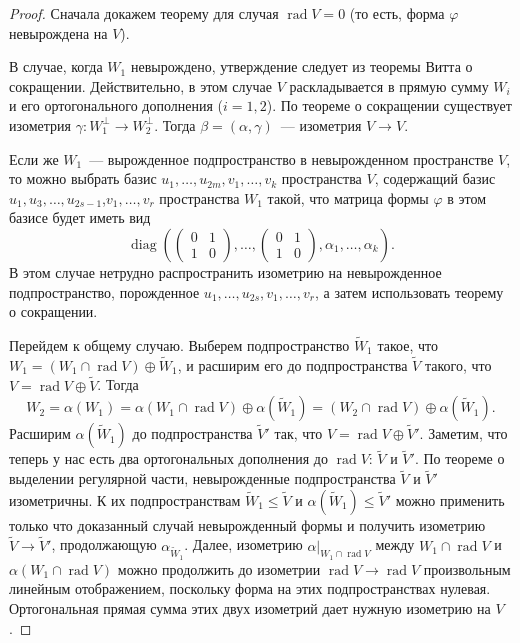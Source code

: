 \documentclass[a4paper,oneside,12pt]{article}
\theoremstyle{plain} { \swapnumbers
\newtheorem{theorem}{Теорема}[subsection]
\newtheorem{corollary}[theorem]{Следствие}
\newtheorem{lemma}[theorem]{Лемма}
\newtheorem{proposition}[theorem]{Утверждение}
\newtheorem{claim}[theorem]{Факт}
}
\theoremstyle{definition} { \swapnumbers
\newtheorem{definition}[theorem]{Определение}
\newtheorem{notation}[theorem]{Обозначение}
\newtheorem{remark}[theorem]{Замечание}
\newtheorem{remarks}[theorem]{Замечания}
\newtheorem{example}[theorem]{Пример}
\newtheorem{examples}[theorem]{Примеры}
\newtheorem{sssection}[theorem]{}
}
\def\tilde{\widetilde}
\def\ph{\varphi}
\def\rad{\operatorname{rad}}
\def\a{\alpha}
\def\b{\beta}
\begin{document}
\begin{proof}
Сначала докажем теорему для случая $\rad V=0$ (то есть, форма $\ph$ невырождена на $V$).

В случае, когда $W_1$ невырождено, утверждение следует из теоремы Витта о сокращении.
Действительно, в этом случае $V$ раскладывается в прямую сумму $W_i$ и его ортогонального
дополнения ($i=1,2$). По теореме о сокращении существует изометрия 
$\gamma:W_1^\perp\to W_2^\perp$. Тогда $\b=(\a,\gamma)$~--- изометрия $V\to V$.

Если же $W_1$~--- вырожденное подпространство в невырожденном пространстве
$V$, то можно выбрать базис $u_1,\dots,u_{2m},v_1,\dots,v_k$ пространства $V$, содержащий базис 
$u_1,u_3,\dots,u_{2s-1}$,\allowbreak $v_1,\dots,v_r$ пространства $W_1$ такой, 
что матрица формы $\ph$ в этом базисе будет иметь вид
$$
\operatorname{diag}\left(\left(\begin{smallmatrix}0&1\\1&0\end{smallmatrix}\right),\dots,
\left(\begin{smallmatrix}0&1\\1&0\end{smallmatrix}\right),\alpha_1,\dots,\alpha_k\right).
$$
В этом случае нетрудно распространить изометрию на невырожденное подпространство, порожденное
$u_1,\dots,u_{2s},v_1,\dots,v_r$, а затем использовать теорему о сокращении.

Перейдем к общему случаю.
Выберем подпространство $\tilde W_1$ такое, что
$W_1 = (W_1\cap\rad V)\oplus\tilde W_1$,
и расширим его до подпространства $\tilde V$ такого,
что $V = \rad V \oplus\tilde V$.
Тогда
$$
W_2 = \a(W_1) = \a(W_1\cap\rad V)\oplus \a(\tilde W_1) = (W_2\cap\rad V)\oplus \a(\tilde W_1).
$$
Расширим $\a(\tilde W_1)$ до подпространства $\tilde V'$
так, что $V = \rad V\oplus\tilde V'$.
Заметим, что теперь у нас есть два ортогональных дополнения
до $\rad V$: $\tilde V$ и $\tilde V'$.
По теореме о выделении регулярной части, невырожденные
подпространства $\tilde V$ и $\tilde V'$ изометричны.
К их подпространствам $\tilde W_1\leq\tilde V$
и $\a(\tilde W_1)\leq\tilde V'$ можно применить только что
доказанный случай невырожденный формы
и получить изометрию $\tilde V\to \tilde V'$,
продолжающую $\a_{\tilde W_1}$.
Далее, изометрию $\a|_{W_1\cap\rad V}$ между $W_1\cap\rad V$
и $\a(W_1\cap\rad V)$ можно продолжить до изометрии
$\rad V\to\rad V$ произвольным линейным отображением,
поскольку форма на этих подпространствах нулевая.
Ортогональная прямая сумма этих двух изометрий
дает нужную изометрию на $V$.
\end{proof}
\end{document}
